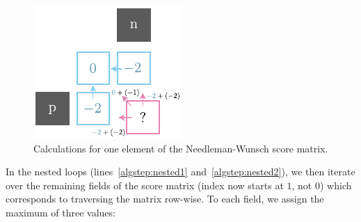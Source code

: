 \begin{figure}[H]
    \centering
    \includegraphics[width=0.55\linewidth]{assets/illustrator/matrix-nuance-puissance-subcalc.pdf}
    \caption{Calculations for one element of the Needleman-Wunsch score matrix.}
    \label{fig:matrix-nuance-puissance-subcalc}
\end{figure}

In the nested loops (lines~\ref{algstep:nested1} and~\ref{algstep:nested2}), we then iterate over the remaining fields of the score matrix (index now starts at $1$, not $0$) which corresponds to traversing the matrix row-wise. To each field, we assign the maximum of three values:


